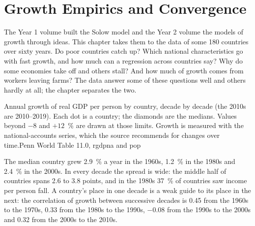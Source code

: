 \chapter{Growth Empirics and Convergence}\label{ch:b3:growth-empirics}

The Year 1 volume built the Solow model and the Year 2 volume the models of growth
through ideas. This chapter takes them to the data of some 180 countries over sixty
years. Do poor countries catch up? Which national characteristics go with fast growth,
and how much can a regression across countries say? Why do some economies take off
and others stall? And how much of growth comes from workers leaving farms? The data
answer some of these questions well and others hardly at all; the chapter separates
the two.

\begin{openingchart}{Annual growth of real GDP per person by country, decade by
decade (the 2010s are 2010--2019). Each dot is a country; the diamonds are the
medians. Values beyond $-8$ and $+12$~\% are drawn at those limits. Growth is measured
with the national-accounts series, which the source recommends for changes over
time.}{Penn World Table 11.0, rgdpna and pop}
\end{openingchart}

The median country grew 2.9~\% a year in the 1960s, 1.2~\% in the 1980s and 2.4~\% in the 2000s. In
every decade the spread is wide: the middle half of countries spans 2.6 to 3.8 points,
and in the 1980s 37~\% of countries saw income per person fall. A country's place in one
decade is a weak guide to its place in the next: the correlation of growth between
successive decades is 0.45 from the 1960s to the 1970s, 0.33 from the 1980s to the 1990s,
$-0.08$ from the 1990s to the 2000s and 0.32 from the 2000s to the 2010s.

